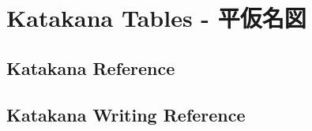 \chapter{Katakana Tables - 平仮名図}

\section{Katakana Reference}


\section{Katakana Writing Reference}


%

\newpage
